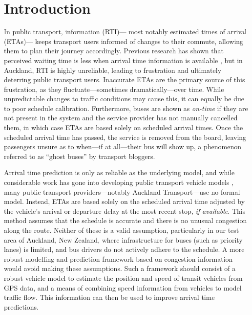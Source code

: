 \section{Introduction}
\label{sec:intro}


In public transport, \rt information (RTI)---%
most notably estimated times of arrival (ETAs)---%
keeps transport users informed of changes to their commute,
allowing them to plan their journey accordingly.
Previous research has shown that perceived waiting time is less
when arrival time information is available \citep{TCRP_2003b},
but in Auckland, RTI is highly unreliable,
leading to frustration and ultimately deterring public transport users.
Inaccurate ETAs are the primary source of this frustration,
as they fluctuate---sometimes dramatically---over time.
While unpredictable changes to traffic conditions may cause this,
it can equally be due to poor schedule calibration.
Furthermore, buses are shown as \emph{on-time} 
if they are not present in the \rt system and 
the service provider has not manually cancelled them,
in which case ETAs are based solely on scheduled arrival times.
Once the scheduled arrival time has passed,
the service is removed from the \rt board,
leaving passengers unsure as to when---if at all---their bus will show up,
a phenomenon referred to as ``ghost buses'' by transport bloggers.


Arrival time prediction is only as reliable as the underlying model,
and while considerable work has gone into developing public transport vehicle models
\citep{Cathey_2003,Jeong_2005,Yu_2011,Hans_2015},
many public transport providers---notably Auckland Transport---use no formal model.
Instead, ETAs are based solely on the scheduled arrival time
adjusted by the vehicle's arrival or departure delay at the most recent stop, 
\emph{if available}.
This method assumes that the schedule is accurate
and there is no unusual congestion along the route.
Neither of these is a valid assumption,
particularly in our test area of Auckland, New Zealand,
where infrastructure for buses (such as priority lanes) is limited,
and bus drivers do not actively adhere to the schedule.
A more robust modelling and prediction framework 
based on \rt congestion information would avoid making these assumptions.
Such a framework should consist of a robust vehicle model to estimate the position and speed
of transit vehicles from \rt GPS data,
and a means of combining speed information from vehicles
to model traffic flow.
This information can then be used to improve arrival time predictions.


